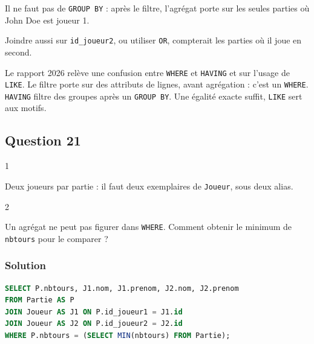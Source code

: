 \documentclass[11pt,a4paper]{article}
\begin{document}
Il ne faut pas de \texttt{GROUP\ BY} : après le filtre, l'agrégat porte sur les seules parties où John Doe est joueur 1.

\begin{piege}

Joindre aussi sur \texttt{id\_joueur2}, ou utiliser \texttt{OR}, compterait les parties où il joue en second.

\end{piege}

\begin{piege}

Le rapport 2026 relève une confusion entre \texttt{WHERE} et \texttt{HAVING} et sur l'usage de \texttt{LIKE}. Le filtre porte sur des attributs de lignes, avant agrégation : c'est un \texttt{WHERE}. \texttt{HAVING} filtre des groupes après un \texttt{GROUP\ BY}. Une égalité exacte suffit, \texttt{LIKE} sert aux motifs.

\end{piege}

\hypertarget{question-21}{%
\subsection{Question 21}\label{question-21}}

\begin{indication}{1}

Deux joueurs par partie : il faut deux exemplaires de \texttt{Joueur}, sous deux alias.

\end{indication}

\begin{indication}{2}

Un agrégat ne peut pas figurer dans \texttt{WHERE}. Comment obtenir le minimum de \texttt{nbtours} pour le comparer ?

\end{indication}

\hypertarget{solution-20}{%
\subsubsection{Solution}\label{solution-20}}

\begin{lstlisting}[language=SQL]
SELECT P.nbtours, J1.nom, J1.prenom, J2.nom, J2.prenom
FROM Partie AS P
JOIN Joueur AS J1 ON P.id_joueur1 = J1.id
JOIN Joueur AS J2 ON P.id_joueur2 = J2.id
WHERE P.nbtours = (SELECT MIN(nbtours) FROM Partie);
\end{lstlisting}
\end{document}
